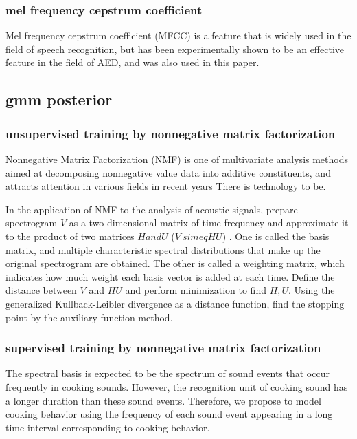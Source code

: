 \documentclass[sigchi]{acmart}
\begin{document}
\subsubsection{mel frequency cepstrum coefficient}

Mel frequency cepstrum coefficient (MFCC) is a feature that is widely used in the field of speech recognition, but has been experimentally shown to be an effective feature in the field of AED, and was also used in this paper.

\subsection{gmm posterior}

\subsubsection{unsupervised training by nonnegative matrix factorization}
Nonnegative Matrix Factorization (NMF) is one of multivariate analysis methods aimed at decomposing nonnegative value data into additive constituents, and attracts attention in various fields in recent years There is technology to be.

In the application of NMF to the analysis of acoustic signals, prepare spectrogram $ V $ as a two-dimensional matrix of time-frequency and approximate it to the product of two matrices $ H and U $ ($ V \ simeq HU $) . One is called the basis matrix, and multiple characteristic spectral distributions that make up the original spectrogram are obtained. The other is called a weighting matrix, which indicates how much weight each basis vector is added at each time. Define the distance between $ V $ and $ HU $ and perform minimization to find $ H, U $.
Using the generalized Kullback-Leibler divergence as a distance function, find the stopping point by the auxiliary function method.

\subsubsection{supervised training by nonnegative matrix factorization}
The spectral basis is expected to be the spectrum of sound events that occur frequently in cooking sounds. However, the recognition unit of cooking sound has a longer duration than these sound events. Therefore, we propose to model cooking behavior using the frequency of each sound event appearing in a long time interval corresponding to cooking behavior.
\end{document}
